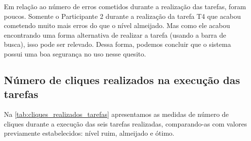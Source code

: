 Em relação ao número de erros cometidos durante a realização das tarefas, foram poucos. Somente o Participante 2 durante a realização da tarefa T4 que acabou cometendo muito mais erros do que o nível almeijado. Mas como ele acabou encontrando uma forma alternativa de realizar a tarefa (usando a barra de busca), isso pode ser relevado. Dessa forma, podemos concluir que o sistema possui uma boa segurança no uso nesse quesito. 

\subsection{Número de cliques realizados na execução das tarefas}
Na \autoref{tab:cliques_realizados_tarefas} apresentamos as medidas de número de cliques durante a execução das seis tarefas realizadas, comparando-as com valores previamente estabelecidos: nível ruim, almeijado e ótimo. 

\begin{table}[H]
\end{table}

